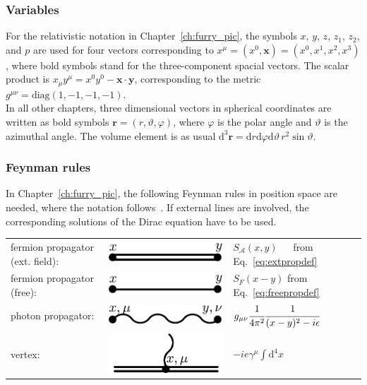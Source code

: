 \subsubsection*{Variables}
For the relativistic notation in Chapter~\ref{ch:furry_pic}, the symbols $x$, $y$, $z$, $z_1$, $z_2$, and $p$ are used for four vectors corresponding to $x^\mu=(x^0,\mathbf{x})=(x^0,x^1,x^2,x^3)$, where bold symbols stand for the three-component spacial vectors. The scalar product is $x_\mu y^\mu = x^0 y^0 - \mathbf{x}\cdot\mathbf{y}$, corresponding to the metric $g^{\mu\nu}=\text{diag}(1,-1,-1,-1)$.\\
In all other chapters, three dimensional vectors in spherical coordinates are written as bold symbols $\mathbf{r}=(r,\vartheta,\varphi)$, where $\varphi$ is the polar angle and $\vartheta$ is the azimuthal angle. The volume element is as usual $\text{d}^3\mathbf{r}=\text{d}r\text{d}\varphi\text{d}\vartheta\, r^2 \sin\vartheta $.
\subsubsection*{Feynman rules}
In Chapter~\ref{ch:furry_pic}, the following Feynman rules in position space are needed, where the notation follows~\cite{itzykson2005}. If external lines are involved, the corresponding solutions of the Dirac equation have to be used.\\

\begin{tabular}{lll}
fermion propagator (ext. field):&\includegraphics[width=0.2\linewidth]{pics/feynrule_1.pdf} & $S_{\mathcal{A}}(x,y)\phantom{-}$ from Eq.~\eqref{eq:extpropdef}\\[7pt]
fermion propagator (free):&\includegraphics[width=0.2\linewidth]{pics/feynrule_2.pdf} &$S_{F}(x-y)$ from Eq.~\eqref{eq:freepropdef}\\[7pt]
photon propagator:&\includegraphics[width=0.2\linewidth]{pics/feynrule_3.pdf} &$g_{\mu\nu}\cfrac{1}{4\pi^2}\cfrac{1}{(x-y)^2-i\epsilon}$\\[7pt]
vertex:&\includegraphics[width=0.2\linewidth]{pics/feynrule_4.pdf} &$-ie\gamma^\mu\int\text{d}^4x$
\end{tabular}
